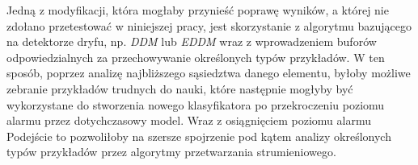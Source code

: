 Jedną z modyfikacji, która mogłaby przynieść poprawę wyników, a której nie zdołano przetestować w niniejszej pracy, jest skorzystanie z algorytmu bazującego na detektorze dryfu, np. \textit{DDM} lub \textit{EDDM} wraz z wprowadzeniem buforów odpowiedzialnych za przechowywanie określonych typów przykładów. W ten sposób, poprzez analizę najbliższego sąsiedztwa danego elementu, byłoby możliwe zebranie przykładów trudnych do nauki, które następnie mogłyby być wykorzystane do stworzenia nowego klasyfikatora po przekroczeniu poziomu alarmu przez dotychczasowy model. Wraz z osiągnięciem poziomu alarmu Podejście to pozwoliłoby na szersze spojrzenie pod kątem analizy określonych typów przykładów przez algorytmy przetwarzania strumieniowego.
